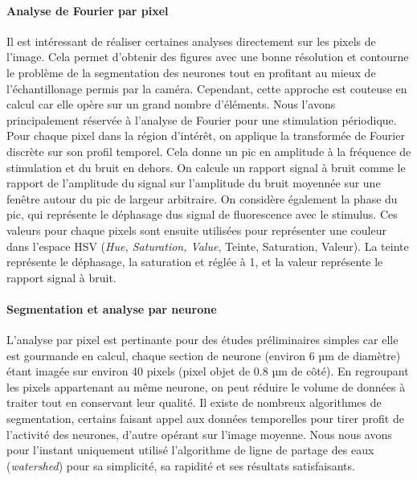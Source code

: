 \paragraph{Analyse de Fourier par pixel}


Il est intéressant de réaliser certaines analyses directement sur les pixels de l'image. Cela permet d'obtenir des figures avec une bonne résolution et contourne le problème de la segmentation des neurones tout en profitant au mieux de l'échantillonage permis par la caméra. Cependant, cette approche est couteuse en calcul car elle opère sur un grand nombre d'éléments. Nous l'avons principalement réservée à l'analyse de Fourier pour une stimulation périodique.
Pour chaque pixel dans la région d'intérêt, on applique la transformée de Fourier discrète sur son profil temporel. Cela donne un pic en amplitude à la fréquence de stimulation et du bruit en dehors. On calcule un rapport signal à bruit comme le rapport de l'amplitude du signal sur l'amplitude du bruit moyennée sur une fenêtre autour du pic de largeur arbitraire. On considère également la phase du pic, qui représente le déphasage dus signal de fluorescence avec le stimulus.
Ces valeurs pour chaque pixels sont ensuite utilisées pour représenter une couleur dans l'espace HSV (\emph{Hue, Saturation, Value}, Teinte, Saturation, Valeur). La teinte représente le déphasage, la saturation et réglée à 1, et la valeur représente le rapport signal à bruit. 

\paragraph{Segmentation et analyse par neurone}

L'analyse par pixel est pertinante pour des études préliminaires simples car elle est gourmande en calcul, chaque section de neurone (environ 6 µm de diamètre) étant imagée sur environ 40 pixels (pixel objet de 0.8 µm de côté). En regroupant les pixels appartenant au même neurone, on peut réduire le volume de données à traiter tout en conservant leur qualité. Il existe de nombreux algorithmes de segmentation, certains faisant appel aux données temporelles pour tirer profit de l'activité des neurones, d'autre opérant sur l'image moyenne. Nous nous avons pour l'instant uniquement utilisé l'algorithme de ligne de partage des eaux (\emph{watershed}) pour sa simplicité, sa rapidité et ses résultats satisfaisants.

